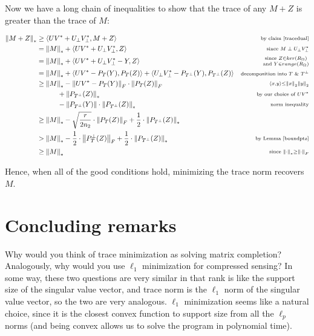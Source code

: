 \documentclass[11pt]{article}
\newcommand{\inprod}[1]{\left\langle #1 \right\rangle}
\newcommand{\norm}[1]{\left\| #1 \right\|}
\begin{document}
 Now we have a long chain of inequalities to show that the trace of any $M+Z$ is greater than the trace of $M$:

\begin{align*} 
\norm{M + Z}_* &\ge \inprod{UV^* + U_\perp V_\perp^*, M + Z}  & \substack{\text{by claim \ref{tracedual}}} \\
&= \norm{M}_* + \inprod{UV^* + U_\perp V_\perp^*, Z } & \substack{\text{since $M \perp U_{\perp} V_{\perp}^*$}}\\
&= \norm{M}_* + \inprod{UV^* + U_\perp V_\perp^* - Y, Z } & \substack{\text{since } Z \in ker(R_\Omega) \\  \text{and } Y \in range(R_\Omega)}\\
&= \norm{M}_* + \inprod{UV^* - P_T(Y), P_T(Z)} + \inprod{U_\perp V_\perp^* - P_{T^\perp} (Y), P_{T^\perp} (Z)} & \substack{\text{decomposition into } T \text{ \& } T^\perp}\\
&\ge \norm{M}_* - \norm{UV^* - P_T(Y)}_F \cdot \norm{P_T(Z)}_F & \substack{\inprod{x,y} \le \norm{x}_2 \norm{y}_2} \\
     &\hspace{3em} + \norm{P_{T^\perp} (Z)}_*  & \substack{\text{by our choice of } UV^*} \\
     &\hspace{3em} - \norm{P_{T^\perp} (Y)} \cdot \norm{P_{T^\perp}(Z)}_* & \substack{\text{norm inequality}}\\
&\ge \norm{M}_* -\sqrt{ \frac{r}{2 n_2} }\cdot \norm{P_T(Z)}_F  + \frac 12\cdot \norm{P_{T^\perp} (Z)}_*&  \\
&> \norm{M}_* -\frac 12 \cdot \norm{P_T^\perp(Z)}_F  + \frac 12\cdot \norm{P_{T^\perp} (Z)}_* &\substack{\text{by Lemma~\ref{boundptz}}}\\
&\ge \norm{M}_* & \substack{\text{since }\norm{\cdot}_* \ge \norm{\cdot}_F}
\end{align*}

Hence, when all of the good conditions hold, minimizing the trace norm recovers $M$.

\section{Concluding remarks}
Why would you think of trace minimization as solving matrix completion? Analogously, why would you use $\ell_1$ minimization for compressed sensing? In some way, these two questions are very similar in that rank is like the support size of the singular value vector, and trace norm is the $\ell_1$ norm of the singular value vector, so the two are very analogous. $\ell_1$ minimization seems like a natural choice, since it is the closest convex function to support size from all the $\ell_p$ norms (and being convex allows us to solve the program in polynomial time).
\end{document}
